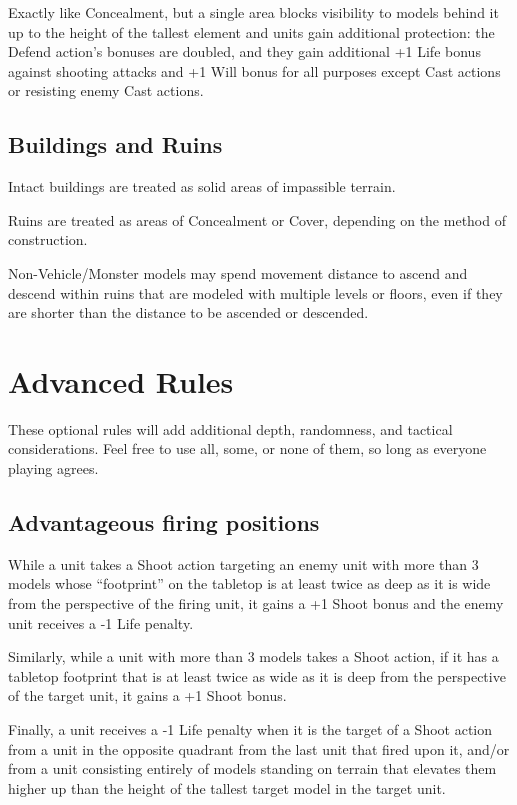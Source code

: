 \begin{multicols}{2}
Exactly like Concealment, but a single area blocks visibility to models behind it up to the height of the tallest element and units gain additional protection: the Defend action's bonuses are doubled, and they gain additional +1 Life bonus against shooting attacks and +1 Will bonus for all purposes except Cast actions or resisting enemy Cast actions.


\section*{Buildings and Ruins}
Intact buildings are treated as solid areas of impassible terrain.

Ruins are treated as areas of Concealment or Cover, depending on the method of construction.

Non-Vehicle/Monster models may spend movement distance to ascend and descend within ruins that are modeled with multiple levels or floors, even if they are shorter than the distance to be ascended or descended.





\chapter*{Advanced Rules}
These optional rules will add additional depth, randomness, and tactical considerations. Feel free to use all, some, or none of them, so long as everyone playing agrees.




\section*{Advantageous firing positions}
While a unit takes a Shoot action targeting an enemy unit with more than 3 models whose ``footprint'' on the tabletop is at least twice as deep as it is wide from the perspective of the firing unit, it gains a +1 Shoot bonus and the enemy unit receives a -1 Life penalty.

Similarly, while a unit with more than 3 models takes a Shoot action, if it has a tabletop footprint that is at least twice as wide as it is deep from the perspective of the target unit, it gains a +1 Shoot bonus.

Finally, a unit receives a -1 Life penalty when it is the target of a Shoot action from a unit in the opposite quadrant from the last unit that fired upon it, and/or from a unit consisting entirely of models standing on terrain that elevates them higher up than the height of the tallest target model in the target unit.


\end{multicols}
